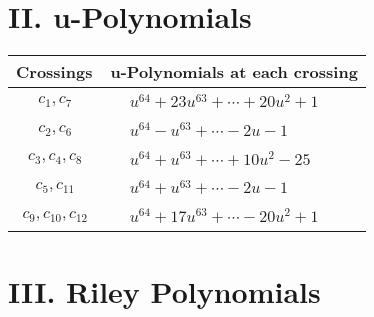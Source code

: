 \documentclass[1p]{elsarticle_modified}
\theoremstyle{definition}
\begin{document}
\newpage\renewcommand{\arraystretch}{1}
\centering \section*{ II. u-Polynomials}
\begin{tabular}{m{50pt}|m{274pt}}
Crossings & \hspace{64pt}u-Polynomials at each crossing \\
\hline $$\begin{aligned}c_{1},c_{7}\end{aligned}$$&$\begin{aligned}
&u^{64}+23 u^{63}+\cdots+20 u^2+1
\end{aligned}$\\
\hline $$\begin{aligned}c_{2},c_{6}\end{aligned}$$&$\begin{aligned}
&u^{64}- u^{63}+\cdots-2 u-1
\end{aligned}$\\
\hline $$\begin{aligned}c_{3},c_{4},c_{8}\end{aligned}$$&$\begin{aligned}
&u^{64}+u^{63}+\cdots+10 u^2-25
\end{aligned}$\\
\hline $$\begin{aligned}c_{5},c_{11}\end{aligned}$$&$\begin{aligned}
&u^{64}+u^{63}+\cdots-2 u-1
\end{aligned}$\\
\hline $$\begin{aligned}c_{9},c_{10},c_{12}\end{aligned}$$&$\begin{aligned}
&u^{64}+17 u^{63}+\cdots-20 u^2+1
\end{aligned}$\\
\hline
\end{tabular}\newpage\renewcommand{\arraystretch}{1}
\centering \section*{ III. Riley Polynomials}
\end{document}
